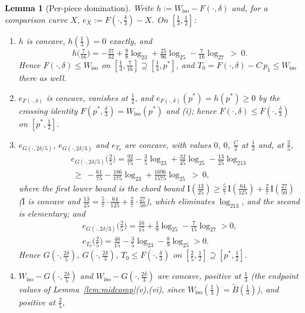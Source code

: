 \documentclass[journal]{IEEEtran}
\newtheorem{lemma}{Lemma}
\theoremstyle{definition}
\newcommand{\lgg}{\log_2}
\newcommand{\CC}{C}
\begin{document}
\begin{lemma}[Per-piece domination]\label{lem:envdom}
Write $h:=W_{\mathrm{iso}}-F(\cdot,\delta)$ and, for a comparison curve $X$,
$e_X:=F(\cdot,\tfrac\delta3)-X$. On $[\tfrac13,\tfrac12]$:
\begin{enumerate}
\item[\textup{(i)}] $h$ is concave, $h(\tfrac13)=0$ exactly, and
\[
  h\bigl(\tfrac7{16}\bigr)
  =-\tfrac{37}{32}+\tfrac98\lgg3+\tfrac{25}{96}\lgg5-\tfrac7{16}\lgg7\ >\ 0 .
\]
Hence $F(\cdot,\delta)\le W_{\mathrm{iso}}$
on $[\tfrac13,\tfrac7{16}]\supseteq[\tfrac13,p^*]$, and
$T_0=F(\cdot,\delta)-\CC\,p_1\le W_{\mathrm{iso}}$ there as well.
\item[\textup{(ii)}] $e_{F(\cdot,\delta)}$ is concave, vanishes at $\tfrac12$,
and $e_{F(\cdot,\delta)}(p^*)=h(p^*)\ge0$ by the crossing identity
$F(p^*,\tfrac{\delta}3)=W_{\mathrm{iso}}(p^*)$ and (i); hence
$F(\cdot,\delta)\le F(\cdot,\tfrac\delta3)$ on $[p^*,\tfrac12]$.
\item[\textup{(iii)}] $e_{G(\cdot,2\delta/5)}$, $e_{G(\cdot,2\delta/3)}$ and
$e_{T_0}$ are concave, with values $0$, $0$, $\tfrac{\CC}2$ at $\tfrac12$ and,
at $\tfrac25$,
\begin{multline*}
  e_{G(\cdot,2\delta/5)}\bigl(\tfrac25\bigr)
  =\tfrac{92}{75}-\tfrac35\lgg3+\tfrac{32}{45}\lgg5-\tfrac{13}{25}\lgg13\\
  \ \ge\ -\tfrac{61}{75}-\tfrac{186}{175}\lgg3+\tfrac{1696}{1575}\lgg5
  \ >\ 0,
\end{multline*}
where the first lower bound is the chord bound
$\mathrm I(\tfrac{13}{25})\ge\tfrac57\,\mathrm I(\tfrac{64}{125})
+\tfrac27\,\mathrm I(\tfrac{27}{50})$ ($\mathrm I$ is concave and
$\tfrac{13}{25}=\tfrac57\cdot\tfrac{64}{125}+\tfrac27\cdot\tfrac{27}{50}$),
which eliminates $\lgg13$, and the second is elementary; and
\begin{gather*}
  e_{G(\cdot,2\delta/3)}\bigl(\tfrac25\bigr)
  =\tfrac{16}{15}+\tfrac19\lgg5-\tfrac7{15}\lgg7>0,\\
  e_{T_0}\bigl(\tfrac25\bigr)
  =\tfrac{46}{15}-\tfrac35\lgg3-\tfrac89\lgg5>0 .
\end{gather*}
Hence $G(\cdot,\tfrac{2\delta}5)$,
$G(\cdot,\tfrac{2\delta}3)$, $T_0\le F(\cdot,\tfrac\delta3)$ on
$[\tfrac25,\tfrac12]\supseteq[p^*,\tfrac12]$.
\item[\textup{(iv)}] $W_{\mathrm{iso}}-G(\cdot,\tfrac{2\delta}5)$ and
$W_{\mathrm{iso}}-G(\cdot,\tfrac{2\delta}3)$ are concave, positive at
$\tfrac13$ (the endpoint values of
Lemma~\ref{lem:midcomp}(v),(vi), since
$W_{\mathrm{iso}}(\tfrac13)=\tilde B(\tfrac13)$), and positive at $\tfrac25$,

\end{enumerate}
\end{lemma}
\end{document}
